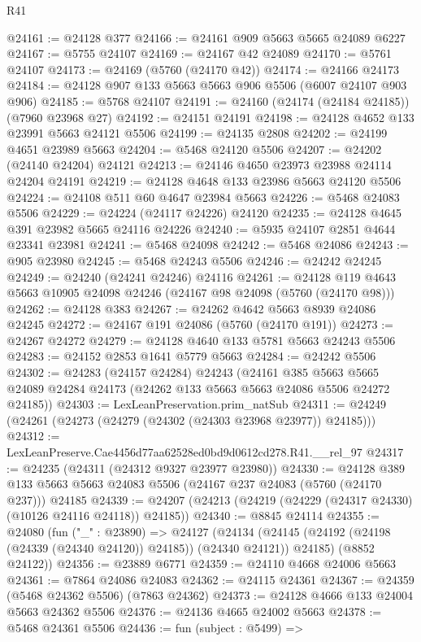 \begin{lexlean}{R41}
\begin{coremodule}
@24161 := @24128 @377
@24166 := @24161 @909 @5663 @5665 @24089 @6227
@24167 := @5755 @24107
@24169 := @24167 @42 @24089
@24170 := @5761 @24107
@24173 := @24169 (@5760 (@24170 @42))
@24174 := @24166 @24173
@24184 := @24128 @907 @133 @5663 @5663 @906 @5506 (@6007 @24107 @903 @906)
@24185 := @5768 @24107
@24191 := @24160 (@24174 (@24184 @24185)) (@7960 @23968 @27)
@24192 := @24151 @24191
@24198 := @24128 @4652 @133 @23991 @5663 @24121 @5506
@24199 := @24135 @2808
@24202 := @24199 @4651 @23989 @5663
@24204 := @5468 @24120 @5506
@24207 := @24202 (@24140 @24204) @24121
@24213 := @24146 @4650 @23973 @23988 @24114 @24204 @24191
@24219 := @24128 @4648 @133 @23986 @5663 @24120 @5506
@24224 := @24108 @511 @60 @4647 @23984 @5663
@24226 := @5468 @24083 @5506
@24229 := @24224 (@24117 @24226) @24120
@24235 := @24128 @4645 @391 @23982 @5665 @24116 @24226
@24240 := @5935 @24107 @2851 @4644 @23341 @23981
@24241 := @5468 @24098
@24242 := @5468 @24086
@24243 := @905 @23980
@24245 := @5468 @24243 @5506
@24246 := @24242 @24245
@24249 := @24240 (@24241 @24246) @24116
@24261 := @24128 @119 @4643 @5663 @10905 @24098 @24246 (@24167 @98 @24098 (@5760 (@24170 @98)))
@24262 := @24128 @383
@24267 := @24262 @4642 @5663 @8939 @24086 @24245
@24272 := @24167 @191 @24086 (@5760 (@24170 @191))
@24273 := @24267 @24272
@24279 := @24128 @4640 @133 @5781 @5663 @24243 @5506
@24283 := @24152 @2853 @1641 @5779 @5663
@24284 := @24242 @5506
@24302 := @24283
    (@24157 @24284)
    @24243
    (@24161
      @385
      @5663
      @5665
      @24089
      @24284
      @24173
      (@24262 @133 @5663 @5663 @24086 @5506 @24272 @24185))
@24303 := LexLeanPreservation.prim_natSub
@24311 := @24249 (@24261 (@24273 (@24279 (@24302 (@24303 @23968 @23977)) @24185)))
@24312 := LexLeanPreserve.Cae4456d77aa62528ed0bd9d0612cd278.R41.__rel_97
@24317 := @24235 (@24311 (@24312 @9327 @23977 @23980))
@24330 := @24128
    @389
    @133
    @5663
    @5663
    @24083
    @5506
    (@24167 @237 @24083 (@5760 (@24170 @237)))
    @24185
@24339 := @24207 (@24213 (@24219 (@24229 (@24317 @24330) (@10126 @24116 @24118)) @24185))
@24340 := @8845 @24114
@24355 := @24080
    (fun ("_" : @23890) =>
    @24127
      (@24134 (@24145 (@24192 (@24198 (@24339 (@24340 @24120)) @24185)) (@24340 @24121)) @24185)
      (@8852 @24122))
@24356 := @23889 @6771
@24359 := @24110 @4668 @24006 @5663
@24361 := @7864 @24086 @24083
@24362 := @24115 @24361
@24367 := @24359 (@5468 @24362 @5506) (@7863 @24362)
@24373 := @24128 @4666 @133 @24004 @5663 @24362 @5506
@24376 := @24136 @4665 @24002 @5663
@24378 := @5468 @24361 @5506
@24436 := fun (subject : @5499) =>

\end{coremodule}
\end{lexlean}
